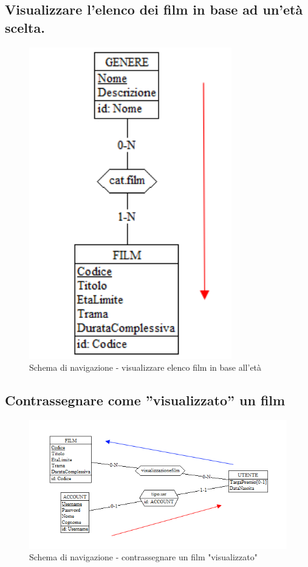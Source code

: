 \documentclass[a4paper,12pt]{report}
\begin{document}
	\subsection{Visualizzare l’elenco dei film in base ad un’età scelta.}
	\begin{figure}[H]
		\centering
		\includegraphics[width=250pt]{ER/navigazione/visualizzarefilm.png}
		\caption{Schema di navigazione - visualizzare elenco film in base all'età}
	\end{figure}
	
	\subsection{Contrassegnare come ”visualizzato” un film}
	\begin{figure}[H]
		\centering
		\includegraphics[width=450pt]{ER/navigazione/visualizzatofilm.png}
		\caption{Schema di navigazione - contrassegnare un film "visualizzato"}
	\end{figure}
	
\end{document}
